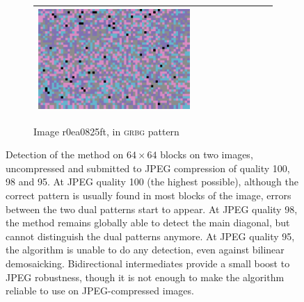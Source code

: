 \documentclass{ipol}
\begin{document}
\begin{figure}[ht]
\begin{subfigure}[t]{\linewidth}
\begin{tabular}{ccccccccc}
                \includegraphics[width=\s]{images/night/VNG/bid_j95_64_grids.png}\\
                \bottomrule
        \end{tabular}
        \caption{Image r0ea0825ft, in \textsc{grbg} pattern}
\end{subfigure}
\caption{Detection of the method on $64\times64$ blocks on two images, uncompressed and submitted to JPEG compression of quality 100, 98 and 95. At JPEG quality 100 (the highest possible), although the correct pattern is usually found in most blocks of the image, errors between the two dual patterns start to appear. At JPEG quality 98, the method remains globally able to detect the main diagonal, but cannot distinguish the dual patterns anymore. At JPEG quality 95, the algorithm is unable to do any detection, even against bilinear demosaicking. Bidirectional intermediates provide a small boost to JPEG robustness, though it is not enough to make the algorithm reliable to use on JPEG-compressed images.}
\label{fig:jpeg}
\end{figure}
\end{document}
